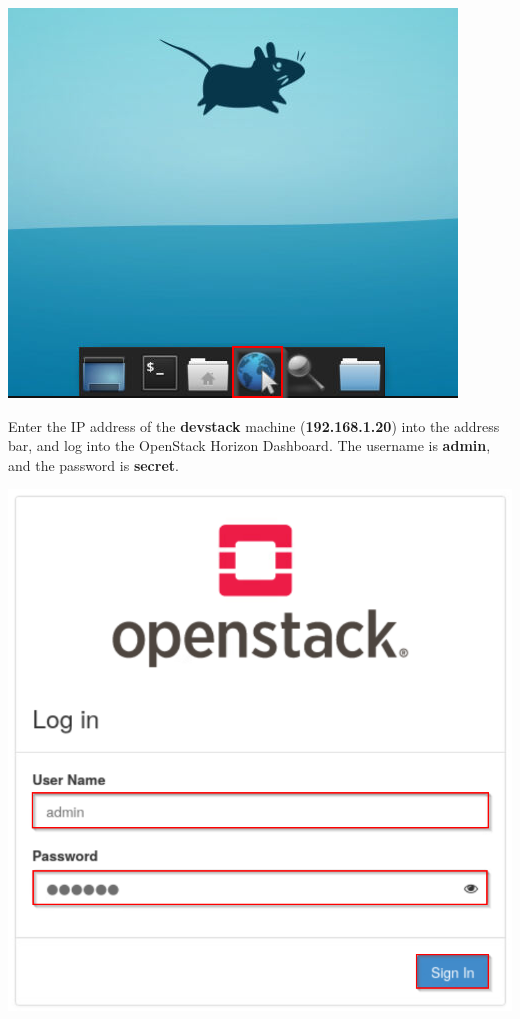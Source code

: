 \documentclass[letterpaper, 12pt]{article}
\begin{document}
\begin{enumerate}
\begin{labstep}
        \begin{center}
            \includegraphics[scale=0.7]{images/part1/step3.png}
        \end{center}
    \end{labstep}

    \begin{labstep}
        Enter the IP address of the \textbf{devstack} machine (\textbf{192.168.1.20}) into the address bar, and log into the OpenStack Horizon Dashboard.
        The username is \textbf{admin}, and the password is \textbf{secret}.

        \begin{center}
            \includegraphics[scale=0.5]{images/part1/step4.png}
        \end{center}
    \end{labstep}


\end{enumerate}
\end{document}

